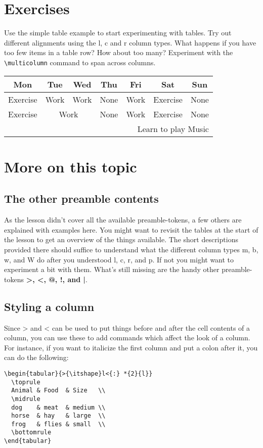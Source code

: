 \documentclass{article}
\begin{document}
\section{Exercises}
Use the simple table example to start experimenting with tables. Try out different alignments using the l, c and r column types. What happens if you have too few items in a table row? How about too many? Experiment with the \verb|\multicolumn| command to span across columns.

\vspace{0.5cm}
\begin{tabular}{*{7}{c}}
     \toprule
     Mon & Tue & Wed & Thu & Fri & Sat & Sun \\
     \midrule
     Exercise & Work & Work & None & Work & Exercise & None \\ 
     Exercise & \multicolumn{2}{c}{Work} & None & Work & Exercise & None \\ 
     \multicolumn{7}{r}{Learn to play Music} \\
\end{tabular}

\section{More on this topic}
\subsection{The other preamble contents}
As the lesson didn’t cover all the available preamble-tokens, a few others are explained with examples here. You might want to revisit the tables at the start of the lesson to get an overview of the things available. The short descriptions provided there should suffice to understand what the different column types m, b, w, and W do after you understood l, c, r, and p. If not you might want to experiment a bit with them. What’s still missing are the handy other preamble-tokens \textbf{>, <, @, !, and |}.

\subsection{Styling a column}
Since > and < can be used to put things before and after the cell contents of a column, you can use these to add commands which affect the look of a column. For instance, if you want to italicize the first column and put a colon after it, you can do the following:

\begin{verbatim}
\begin{tabular}{>{\itshape}l<{:} *{2}{l}}
  \toprule
  Animal & Food  & Size   \\
  \midrule
  dog    & meat  & medium \\
  horse  & hay   & large  \\
  frog   & flies & small  \\
  \bottomrule
\end{tabular}
\end{verbatim}
\end{document}

